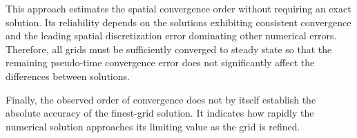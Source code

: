 This approach estimates the spatial convergence order without
requiring an exact solution. Its reliability depends on the
solutions exhibiting consistent convergence and the leading
spatial discretization error dominating other numerical errors.
Therefore, all grids must be sufficiently converged to steady
state so that the remaining pseudo-time convergence error does
not significantly affect the differences between solutions.

Finally, the observed order of convergence does not by itself
establish the absolute accuracy of the finest-grid solution.
It indicates how rapidly the numerical solution approaches
its limiting value as the grid is refined.